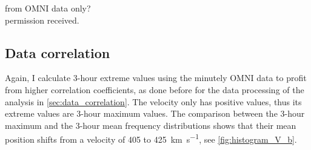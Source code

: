 
from OMNI data only?\\
permission received.\\


\subsection{Data correlation}
Again, I calculate 3-hour extreme values using the minutely OMNI data to profit from higher correlation coefficients, as done before for the data processing of the \vBz{} analysis in \autoref{sec:data_correlation}. The velocity only has positive values, thus its extreme values are 3-hour maximum values. The comparison between the 3-hour maximum and the 3-hour mean frequency distributions shows that their mean position shifts from a velocity of 405 to \SI{425}{\km\per\s}, see \autoref{fig:histogram_V_b}.
